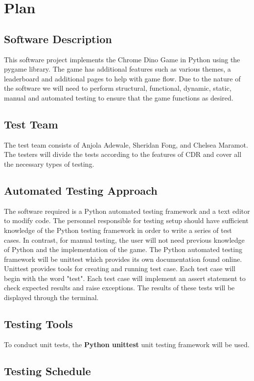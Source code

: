 \documentclass[12pt, titlepage]{article}
\begin{document}
\section{Plan}
	
\subsection{Software Description}
This software project implements the Chrome Dino Game in Python using the pygame library. The game has additional features such as various themes, a leaderboard and additional pages to help with game flow. Due to the nature of the software we will need to perform structural, functional, dynamic, static, manual and automated testing to ensure that the game functions as desired. 

\subsection{Test Team}
The test team consists of Anjola Adewale, Sheridan Fong, and Chelsea Maramot. The testers will divide the tests according to the features of CDR and cover all the necessary types of testing.


\subsection{Automated Testing Approach}

The software required is a Python automated testing framework and a text editor to modify code. The personnel responsible for testing setup should have sufficient knowledge of the Python testing framework in order to write a series of test cases. In contrast, for manual testing, the user will not need previous knowledge of Python and the implementation of the game. The Python automated testing framework will be unittest which provides its own documentation found online. Unittest provides tools for creating and running test case. Each test case will begin with the word "test". Each test case will implement an assert statement to check expected results and raise exceptions. The results of these tests will be displayed through the terminal. 
\subsection{Testing Tools}

To conduct unit tests, the \textbf{Python unittest} unit testing framework will be used.


\subsection{Testing Schedule}
		
\end{document}
